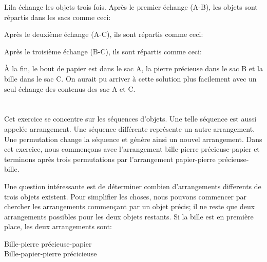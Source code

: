 {{{\centering%
\par}

Lila échange les objets trois fois. Après le premier échange (A-B), les objets sont répartis dans les sacs comme ceci:

{\centering%
\par}

Après le deuxième échange (A-C), ils sont répartis comme ceci:

{\centering%
\par}

Après le troisième échange (B-C), ils sont répartis comme ceci:

{\centering%
\par}

À la fin, le bout de papier est dans le sac A, la pierre précieuse dans le sac B et la bille dans le sac C. On aurait pu arriver à cette solution plus facilement avec un seul échange des contenus des sac A et C.



\section*{\BrochureItsInformatics}
Cet exercice se concentre sur les séquences d’objets. Une telle séquence est aussi appelée arrangement. Une séquence différente représente un autre arrangement. Une permutation change la séquence et génère ainsi un nouvel arrangement. Dans cet exercice, nous commençons avec l’arrangement bille-pierre précieuse-papier et terminons après trois permutations par l’arrangement papier-pierre précieuse-bille.

Une question intéressante est de déterminer combien d’arrangements differents de trois objets existent. Pour simplifier les choses, nous pouvons commencer par chercher les arrangements commençant par un objet précis; il ne reste que deux arrangements possibles pour les deux objets restants. Si la bille est en première place, les deux arrangements sont:

\begin{adjustwidth}{1.5em}{0em}
Bille-pierre précieuse-papier     \\
Bille-papier-pierre précicieuse
\end{adjustwidth}

}}

